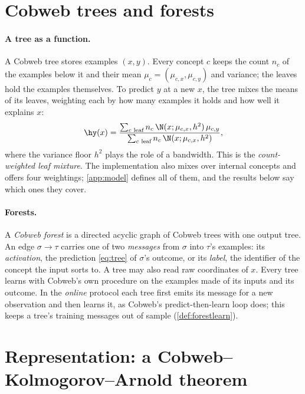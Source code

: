 \section{Cobweb trees and forests}\label{sec:forests}

\paragraph{A tree as a function.}
A Cobweb tree stores examples $(x,y)$.  Every concept $c$ keeps the count $n_c$ of the
examples below it and their mean $\mu_c=(\mu_{c,x},\mu_{c,y})$ and variance; the leaves
hold the examples themselves.  To predict $y$ at a new $x$, the tree mixes the means of
its leaves, weighting each by how many examples it holds and how well it explains $x$:
\begin{equation}\label{eq:tree}
  \hy(x)=\frac{\sum_{c\text{ leaf}}n_c\,\N(x;\mu_{c,x},h^2)\,\mu_{c,y}}
              {\sum_{c\text{ leaf}}n_c\,\N(x;\mu_{c,x},h^2)},
\end{equation}
where the variance floor $h^2$ plays the role of a bandwidth.  This is the
\emph{count-weighted leaf mixture}.  The implementation also mixes over internal concepts and
offers four weightings; \cref{app:model} defines all of them, and the results below say
which ones they cover.

\paragraph{Forests.}
A \emph{Cobweb forest} is a directed acyclic graph of Cobweb trees with one output tree.
An edge $\sigma\to\tau$ carries one of two \emph{messages} from $\sigma$ into $\tau$'s
examples: its \emph{activation}, the prediction \eqref{eq:tree} of $\sigma$'s outcome,
or its \emph{label}, the identifier of the concept the input sorts to.  A tree may also
read raw coordinates of $x$.  Every tree learns with Cobweb's own procedure on the
examples made of its inputs and its outcome.  In the \emph{online} protocol each tree
first emits its message for a new observation and then learns it, as Cobweb's
predict-then-learn loop does; this keeps a tree's training messages out of sample
(\cref{def:forestlearn}).

\section{Representation: a Cobweb--Kolmogorov--Arnold theorem}\label{sec:repr-main}

